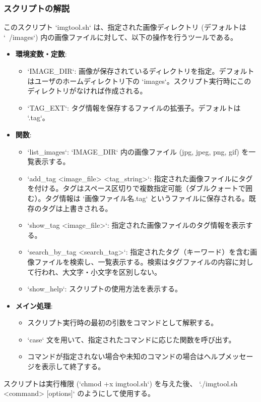 \documentclass[a4paper,11pt]{jsarticle}
\begin{document}
\subsubsection*{スクリプトの解説}
このスクリプト `imgtool.sh` は、指定された画像ディレクトリ (デフォルトは `~/images`) 内の画像ファイルに対して、以下の操作を行うツールである。
\begin{itemize}
    \item \textbf{環境変数・定数}:
    \begin{itemize}
        \item `IMAGE\_DIR`: 画像が保存されているディレクトリを指定。デフォルトはユーザのホームディレクトリ下の `images`。スクリプト実行時にこのディレクトリがなければ作成される。
        \item `TAG\_EXT`: タグ情報を保存するファイルの拡張子。デフォルトは `.tag`。
    \end{itemize}
    \item \textbf{関数}:
    \begin{itemize}
        \item `list\_images`: `IMAGE\_DIR` 内の画像ファイル (jpg, jpeg, png, gif) を一覧表示する。
        \item `add\_tag <image\_file> <tag\_string>`: 指定された画像ファイルにタグを付ける。タグはスペース区切りで複数指定可能（ダブルクォートで囲む）。タグ情報は `画像ファイル名.tag` というファイルに保存される。既存のタグは上書きされる。
        \item `show\_tag <image\_file>`: 指定された画像ファイルのタグ情報を表示する。
        \item `search\_by\_tag <search\_tag>`: 指定されたタグ（キーワード）を含む画像ファイルを検索し、一覧表示する。検索はタグファイルの内容に対して行われ、大文字・小文字を区別しない。
        \item `show\_help`: スクリプトの使用方法を表示する。
    \end{itemize}
    \item \textbf{メイン処理}:
    \begin{itemize}
        \item スクリプト実行時の最初の引数をコマンドとして解釈する。
        \item `case` 文を用いて、指定されたコマンドに応じた関数を呼び出す。
        \item コマンドが指定されない場合や未知のコマンドの場合はヘルプメッセージを表示して終了する。
    \end{itemize}
\end{itemize}
スクリプトは実行権限 (`chmod +x imgtool.sh`) を与えた後、 `./imgtool.sh <command> [options]` のようにして使用する。
\end{document}
